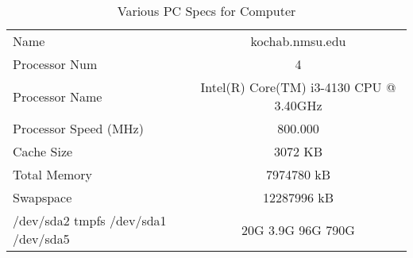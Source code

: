 \documentclass{article}
\begin{document}
\begin{table}
\caption{Various PC Specs for Computer}
\begin{tabular}{l || c}
Name & kochab.nmsu.edu \\
Processor Num & 4 \\
Processor Name & Intel(R) Core(TM) i3-4130 CPU @ 3.40GHz \\
Processor Speed (MHz) & 800.000 \\
Cache Size & 3072 KB \\
Total Memory & 7974780 kB \\
Swapspace & 12287996 kB \\
/dev/sda2 tmpfs /dev/sda1 /dev/sda5 & 20G 3.9G 96G 790G \\
\end{tabular}
\end{table}
\end{document}

